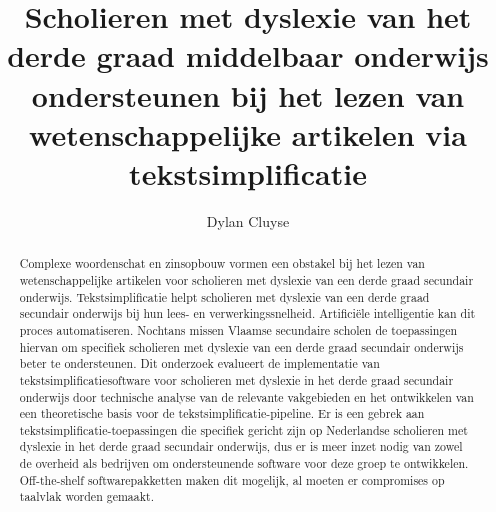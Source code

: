 \documentclass{hogent-article}
\title{Scholieren met dyslexie van het derde graad middelbaar onderwijs ondersteunen bij het lezen van wetenschappelijke artikelen via tekstsimplificatie}
\author{Dylan Cluyse}
\begin{document}
\begin{abstract}
Complexe woordenschat en zinsopbouw vormen een obstakel bij het lezen van wetenschappelijke artikelen voor scholieren met dyslexie van een derde graad secundair onderwijs. Tekstsimplificatie helpt scholieren met dyslexie van een derde graad secundair onderwijs bij hun lees- en verwerkingssnelheid. Artificiële intelligentie kan dit proces automatiseren. Nochtans missen Vlaamse secundaire scholen de toepassingen hiervan om specifiek scholieren met dyslexie van een derde graad secundair onderwijs beter te ondersteunen. Dit onderzoek evalueert de implementatie van tekstsimplificatiesoftware voor scholieren met dyslexie in het derde graad secundair onderwijs door technische analyse van de relevante vakgebieden en het ontwikkelen van een theoretische basis voor de tekstsimplificatie-pipeline. Er is een gebrek aan tekstsimplificatie-toepassingen die specifiek gericht zijn op Nederlandse scholieren met dyslexie in het derde graad secundair onderwijs, dus er is meer inzet nodig van zowel de overheid als bedrijven om ondersteunende software voor deze groep te ontwikkelen. Off-the-shelf softwarepakketten maken dit mogelijk, al moeten er compromises op taalvlak worden gemaakt. 

\end{abstract}

\tableofcontents



\printbibliography[heading=bibintoc]
\end{document}

